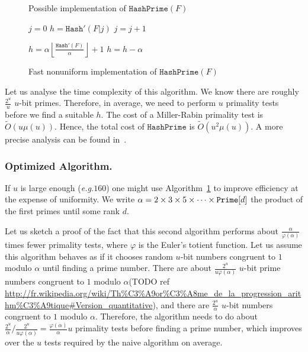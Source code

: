 \documentclass[twoside,envcountsame,runningheads]{llncs}
\newcommand{\Oapp}{\ensuremath{\tilde{O}}}
\newcommand{\eg}{\textit{e.g.}\xspace}
\newcommand{\Hash}{\ensuremath{\mathtt{Hash}}}
\newcommand{\HashPrime}{\ensuremath{\mathtt{HashPrime}}}
\begin{document}
\begin{figure}[t]
\centering
\begin{minipage}[t]{0.49\textwidth}
\begin{algorithm}[H]
  \caption{Possible implementation of $\HashPrime(F)$}
  \label{alg:primes}
  \begin{algorithmic}[1]
  \State $j=0$
\Repeat
\State $h = \Hash'(F|j)$
\State $j = j+1$
\State {}
  \end{algorithmic}
\end{algorithm}
\end{minipage}
\begin{minipage}[t]{0.49\textwidth}
\begin{algorithm}[H]
  \caption{Fast nonuniform implementation of $\HashPrime(F)$}
  \label{alg:scanprime}
  \begin{algorithmic}[1]
  \State $h =\alpha \left\lfloor\frac{\Hash'(F)}{\alpha}\right\rfloor+1$
\State $h = h-\alpha$
\EndWhile
\State {}
  \end{algorithmic}
\end{algorithm}
\end{minipage}
\end{figure}

Let us analyse the time complexity of this algorithm.
We know there are roughly $\frac{2^u}{u}$ $u$-bit primes.
Therefore, in average, we need to perform $u$ primality tests before we find a suitable $h$.
The cost of a Miller-Rabin primality test is $\Oapp(u \mu(u))$.
Hence, the total cost of $\HashPrime$ is $\Oapp(u^2 \mu(u))$.
A more precise analysis can be found in~\cite{PKC:AbdBenPoi13}.

\subsubsection{Optimized Algorithm.}
If $u$ is large enough (\eg $160$) one might %
use Algorithm~\ref{alg:scanprime} to improve efficiency at the expense of uniformity. We write $\alpha=2\times 3\times 5\times \cdots \times \mbox{{\tt Prime}}[d]$ the product of the first primes until some rank $d$.

Let us sketch a proof of the fact that this second algorithm performs about $\frac{\alpha}{\varphi(\alpha)}$ times fewer primality tests, where $\varphi$ is the Euler's totient function.
Let us assume this algorithm behaves as if it chooses random $u$-bit numbers congruent to $1$ modulo $\alpha$ until finding a prime number.
There are about $\frac{2^u}{u \varphi(\alpha)}$ $u$-bit prime numbers congruent to $1$ modulo $\alpha$(TODO ref \url{http://fr.wikipedia.org/wiki/Th%C3%A9or%C3%A8me_de_la_progression_arithm%C3%A9tique#Version_quantitative}), and there are $\frac{2^u}{\alpha}$ $u$-bit numbers congruent to $1$ modulo $\alpha$.
Therefore, the algorithm needs to do about $\frac{2^u}{\alpha} / \frac{2^u}{u \varphi(\alpha)} = \frac{\varphi(\alpha)}{\alpha} u$ primality tests before finding a prime number, which improves over the $u$ tests required by the naive algorithm on average.
\end{document}

